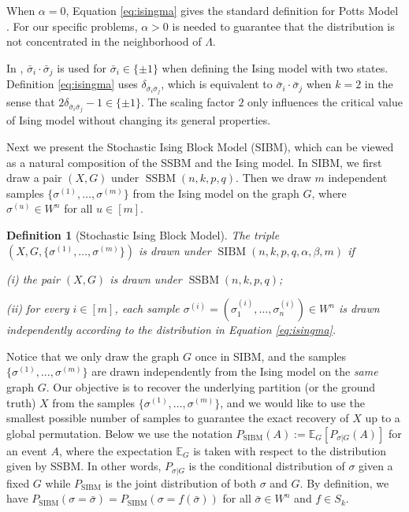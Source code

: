 \documentclass[conference]{IEEEtran}
\newtheorem{definition}{Definition}%
\DeclareMathOperator{\SSBM}{SSBM}
\DeclareMathOperator{\SIBM}{SIBM}
\begin{document}
When $\alpha=0$, Equation \eqref{eq:isingma} gives the standard definition for Potts Model \cite{potts1952some}.
For our specific problems, $\alpha > 0$ is needed to guarantee that the distribution is not concentrated in the neighborhood of $\Lambda$.

In \cite{ye2020exact}, $\bar{\sigma}_i \cdot \bar{\sigma}_j$ is used for $\bar{\sigma}_i \in \{\pm 1\}$ when defining the Ising model with two states.
Definition \ref{eq:isingma} uses  $\delta_{\bar{\sigma}_i\bar{\sigma}_j}$, which is equivalent to $\bar{\sigma}_i \cdot \bar{\sigma}_j$ when $k=2$ in the sense that $2\delta_{\bar{\sigma}_i\bar{\sigma}_j} - 1 \in \{\pm 1\}$. The scaling factor $2$ only influences the
critical value of Ising model without changing its general properties.

Next we present the Stochastic Ising Block Model (SIBM), which can be viewed as a natural composition of the SSBM and the Ising model. In SIBM, we first draw a pair $(X,G)$ under $\SSBM(n,k,p,q)$.  Then we draw $m$ independent samples $\{\sigma^{(1)},\dots,\sigma^{(m)}\}$ from the Ising model on the graph $G$, where $\sigma^{(u)}\in W^n$ for all $u\in[m]$.

\begin{definition}[Stochastic Ising Block Model]
The triple $(X,G,\{\sigma^{(1)},\dots,\sigma^{(m)}\})$ is drawn under $\SIBM(n,k, p,q,\alpha,\beta,m)$ if

\noindent
(i) the pair $(X,G)$ is drawn under $\SSBM(n,k, p,q)$;

\noindent
(ii) for every $i\in[m]$, each sample $\sigma^{(i)}=(\sigma_1^{(i)},\dots,\sigma_n^{(i)}) \in W^n$ is drawn independently according to the distribution in Equation \eqref{eq:isingma}.
\end{definition}

Notice that we only draw the graph $G$ once in SIBM, and the samples $\{\sigma^{(1)},\dots,\sigma^{(m)}\}$ are drawn independently from the Ising model on the {\em same} graph $G$.
Our objective is to recover the underlying partition (or the ground truth) $X$ from the samples $\{\sigma^{(1)},\dots,\sigma^{(m)}\}$, and we would like to use the smallest possible number of samples to guarantee the exact recovery of $X$ up to a global permutation.
Below we use the notation $P_{\SIBM}(A):=\mathbb{E}_G[P_{\sigma|G}(A)]$ for an event $A$, where the expectation $\mathbb{E}_G$ is taken with respect to the distribution given by SSBM. In other words, $P_{\sigma|G}$ is the conditional distribution of  $\sigma$ given a fixed $G$ while $P_{\SIBM}$ is the joint distribution of both $\sigma$ and $G$.
By definition, we have $P_{\SIBM}(\sigma=\bar{\sigma})=P_{\SIBM}(\sigma=f(\bar{\sigma}))$ for all $\bar{\sigma}\in W^n$ and $f\in S_k$.
\end{document}
